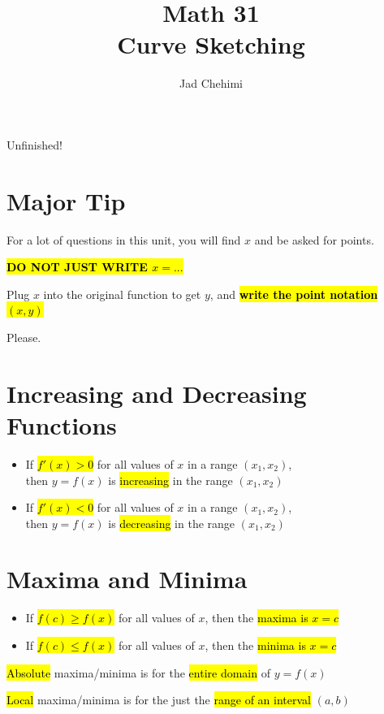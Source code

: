 \documentclass[a4paper,12pt]{article}
\title{Math 31 \\ Curve Sketching}
\author{Jad Chehimi}
\begin{document}
\maketitle

\begin{center}
\Huge
Unfinished!
\normalsize
\end{center}

\tableofcontents

\pagebreak

\section{Major Tip}
For a lot of questions in this unit, you will find $x$ and be asked for points.

\textbf{\hl{DO NOT JUST WRITE $x=...$}}

Plug $x$ into the original function to get $y$, and \textbf{\hl{write the point notation $(x, y)$}}

Please.

\section{Increasing and Decreasing Functions}
\begin{itemize}
    \item{If \hl{$f'(x) > 0$} for all values of $x$ in a range $(x_1, x_2)$,\\then $y = f(x)$ is \hl{increasing} in the range $(x_1, x_2)$}
    \item{If \hl{$f'(x) < 0$} for all values of $x$ in a range $(x_1, x_2)$,\\then $y = f(x)$ is \hl{decreasing} in the range $(x_1, x_2)$}
\end{itemize}

\section{Maxima and Minima}
\begin{itemize}
    \item{If \hl{$f(c) \geq f(x)$} for all values of $x$, then the \hl{maxima is $x = c$}}
    \item{If \hl{$f(c) \leq f(x)$} for all values of $x$, then the \hl{minima is $x = c$}}
\end{itemize}

\hl{Absolute} maxima/minima is for the \hl{entire domain} of $y = f(x)$

\hl{Local} maxima/minima is for the just the \hl{range of an interval} $(a, b)$
\end{document}
